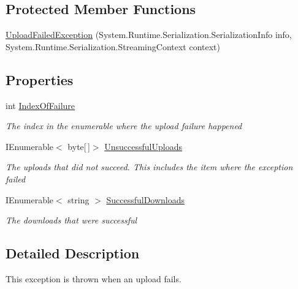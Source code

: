 \subsection*{Protected Member Functions}
\begin{DoxyCompactItemize}
\item 
\hyperlink{class_file_sharing_1_1_upload_failed_exception_af7a1ae41c23fd2ed6d955000f452ecdd}{Upload\+Failed\+Exception} (System.\+Runtime.\+Serialization.\+Serialization\+Info info, System.\+Runtime.\+Serialization.\+Streaming\+Context context)
\end{DoxyCompactItemize}
\subsection*{Properties}
\begin{DoxyCompactItemize}
\item 
int \hyperlink{class_file_sharing_1_1_upload_failed_exception_a3d23421eb17105a8a7bda2723565a02a}{Index\+Of\+Failure}
\begin{DoxyCompactList}\small\item\em The index in the enumerable where the upload failure happened \end{DoxyCompactList}\item 
I\+Enumerable$<$ byte\mbox{[}$\,$\mbox{]}$>$ \hyperlink{class_file_sharing_1_1_upload_failed_exception_a8317cfafa75e732f435c85c50927ce79}{Unsuccessful\+Uploads}
\begin{DoxyCompactList}\small\item\em The uploads that did not succeed. This includes the item where the exception failed \end{DoxyCompactList}\item 
I\+Enumerable$<$ string $>$ \hyperlink{class_file_sharing_1_1_upload_failed_exception_a95a4b29d6b42b184e5c66659e3873e71}{Successful\+Downloads}
\begin{DoxyCompactList}\small\item\em The downloads that were successful \end{DoxyCompactList}\end{DoxyCompactItemize}


\subsection{Detailed Description}
This exception is thrown when an upload fails. 



